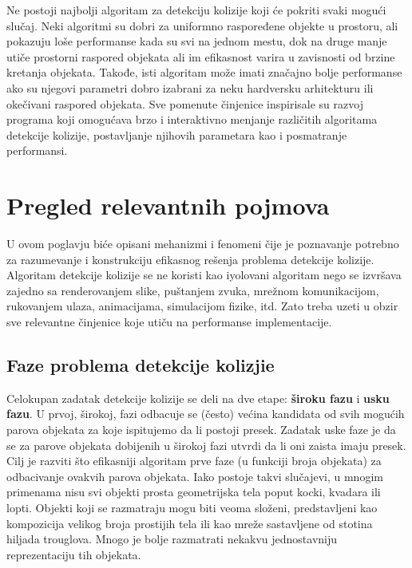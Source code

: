\documentclass[12pt,oneside]{memoir}
\begin{document}
Ne postoji najbolji algoritam za detekciju kolizije koji će pokriti svaki mogući slučaj. 
Neki algoritmi su dobri za uniformno raspoređene objekte u prostoru, ali pokazuju loše performanse kada su svi na jednom mestu, 
dok na druge manje utiče prostorni raspored objekata ali im efikasnost varira u zavisnosti od brzine kretanja objekata.
Takođe, isti algoritam može imati značajno bolje performanse ako su njegovi parametri dobro 
izabrani za neku hardversku arhitekturu ili okečivani raspored objekata. 
Sve pomenute činjenice inspirisale su razvoj programa koji omogućava brzo i interaktivno menjanje različitih
algoritama detekcije kolizije, postavljanje njihovih parametara kao i posmatranje performansi.

\chapter{Pregled relevantnih pojmova}
\label{sec:karakteristike}

U ovom poglavju biće opisani mehanizmi i fenomeni čije je poznavanje potrebno za razumevanje i konstrukciju 
efikasnog rešenja problema detekcije kolizije.
Algoritam detekcije kolizije se ne koristi kao iyolovani algoritam nego se izvršava zajedno sa renderovanjem slike,
puštanjem zvuka, mrežnom komunikacijom, rukovanjem ulaza, animacijama, simulacijom fizike, itd. 
Zato treba uzeti u obzir sve relevantne činjenice koje utiču na performanse implementacije.

\section{Faze problema detekcije kolizjie}

Celokupan zadatak detekcije kolizije se deli na dve etape: \textbf{ široku fazu } i \textbf{usku fazu}. 
U prvoj, širokoj, fazi
odbacuje se (često) većina kandidata od svih mogućih parova objekata za koje ispitujemo da li postoji presek.
Zadatak uske faze je da se za parove objekata dobijenih u širokoj fazi utvrdi da li oni zaista imaju presek.
Cilj je razviti što efikasniji algoritam prve faze (u funkciji broja objekata) za odbacivanje ovakvih parova objekata.
Iako postoje takvi slučajevi, u mnogim primenama nisu svi objekti prosta geometrijska tela poput kocki, kvadara ili lopti.
Objekti koji se razmatraju mogu biti veoma složeni, predstavljeni kao kompozicija velikog broja prostijih tela ili kao mreže sastavljene od stotina hiljada trouglova.
Mnogo je bolje razmatrati nekakvu jednostavniju reprezentaciju tih objekata.
\end{document}
